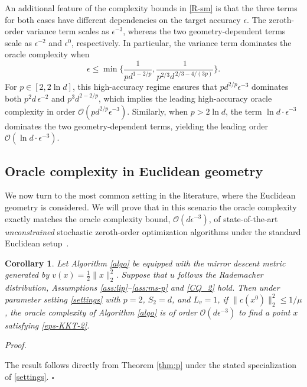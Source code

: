 \documentclass[11pt]{article}
\newtheorem{corollary}{Corollary}[section]
\newenvironment{proof}[1][Proof]{%
    \par\noindent\textit{#1.}\enspace
  }{%
    \hfill\ensuremath{\square}\par
  }%
\numberwithin{equation}{section}
\def\blue#1{\textcolor{blue}{#1}}
\begin{document}
An additional feature of the complexity bounds in \eqref{R-sm} is that the three
terms for both cases have different dependencies on the target accuracy
\(\epsilon\). The zeroth-order variance term scales
as \(\epsilon^{-3}\), whereas the two geometry-dependent terms scale
as \(\epsilon^{-2}\) and \(\epsilon^0\), respectively. In particular,
the variance term  dominates the oracle complexity when
\begin{equation}
\epsilon\le\min\{
   \frac{1}{p d^{1-2/p}},
    \frac{1}{p^{2/3}d^{\,2/3-4/(3p)}}
\}.
\tag{high-accuracy regime}
\end{equation} 
For \(p\in[2,2\ln d]\), this high-accuracy regime  
ensures that \(p d^{2/p}\epsilon^{-3}\) dominates both \(p^2d\,\epsilon^{-2}\) and
\(p^3d^{2-2/p}\), which implies the leading high-accuracy oracle complexity in order 
\(\mathcal O(p d^{2/p}\epsilon^{-3})\).
Similarly, when \(p>2\ln d\), the term \(\ln d\cdot\epsilon^{-3}\) dominates the two
geometry-dependent terms, yielding the leading order 
\(\mathcal O(
        \ln d\cdot\epsilon^{-3}).\)


\subsection{Oracle complexity in Euclidean geometry}
We now turn to the most common setting in the literature, where the Euclidean geometry is considered. 
We will prove that in this scenario the oracle complexity  exactly matches the oracle complexity bound, $\mathcal{O}(d \epsilon^{-3})$, of state-of-the-art {\it unconstrained}  stochastic zeroth-order optimization algorithms under the standard Euclidean setup~\cite{BG22,spider, huang2020accelerated, JWZL,nguyen2022stochastic}.


\begin{corollary}\label{thm:2-norm}
Let Algorithm \ref{algo} be equipped with the mirror descent metric generated by \(v(x) = \frac{1}{2}\|x\|_2^2\). Suppose that $u$ follows the Rademacher distribution,  Assumptions \ref{ass:lip}--\ref{ass:ms-p} and \eqref{CQ_2} hold. Then under   parameter setting \eqref{settings} with $p=2$, $S_2=d$, and $L_v=1$, 
if \(\|c(x^0)\|_2^2\le 1/\mu\), the oracle complexity of Algorithm \ref{algo} is of order  \(  \mathcal{O}(d\epsilon^{-3}) \) 
to find a point \(x\) satisfying \eqref{eps-KKT-2}. 
\end{corollary}

\begin{proof}
The result follows directly from Theorem \ref{thm:p} under the stated specialization of \eqref{settings}. %
\end{proof}
\end{document}
